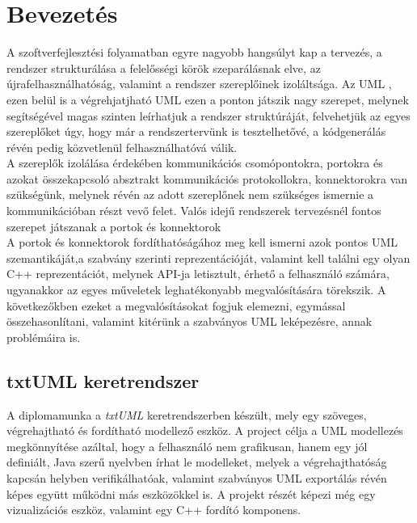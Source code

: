 \documentclass[a4paper,12pt]{report}
\begin{document}

\cleardoublepage

\tableofcontents

\chapter{Bevezetés}
A szoftverfejlesztési folyamatban egyre nagyobb hangsúlyt kap a tervezés, a rendszer strukturálása a felelősségi körök szeparálásnak elve, az újrafelhasználhatóság, valamint a rendszer szereplőinek izoláltsága. Az UML \cite{uml_omg}, ezen belül is a végrehjatjható UML ezen a ponton játszik nagy szerepet, melynek segítségével magas szinten leírhatjuk a rendszer struktúráját, felvehetjük az egyes szereplőket úgy, hogy már a rendszertervünk is tesztelhetővé, a kódgenerálás révén pedig közvetlenül felhasználhatóvá válik. \\ A szereplők izolálása érdekében kommunikációs csomópontokra, portokra és azokat összekapcsoló absztrakt kommunikációs protokollokra, konnektorokra van szükségünk, melynek révén az adott szereplőnek nem szükséges ismernie a kommunikációban részt vevő felet. Valós idejű rendszerek tervezésnél fontos szerepet játszanak a portok és konnektorok \cite{uml_real}\\ 
A portok és konnektorok fordíthatóságához meg kell ismerni azok pontos UML szemantikáját,a szabvány szerinti reprezentációját, valamint kell találni egy olyan C++ reprezentációt, melynek API-ja letisztult, érhető a felhasználó számára, ugyanakkor az egyes műveletek leghatékonyabb megvalósítására törekszik. A következőkben ezeket a megvalósításokat fogjuk elemezni, egymással összehasonlítani, valamint kitérünk a szabványos UML leképezésre, annak problémáira is. \\

\section{txtUML keretrendszer}
A diplomamunka a \textit{txtUML} keretrendszerben készült, mely egy szöveges, végrehajtható és fordítható modellező eszköz. A project célja a UML modellezés megkönnyítése azáltal, hogy a felhasználó nem grafikusan, hanem egy jól definiált, Java szerű nyelvben írhat le modelleket, melyek a végrehajthatóság kapcsán helyben verifikálhatóak, valamint szabványos UML exportálás révén képes együtt működni más eszközökkel is. A projekt részét képezi még egy vizualizációs eszköz, valamint egy C++ fordító komponens.\\
\end{document}

